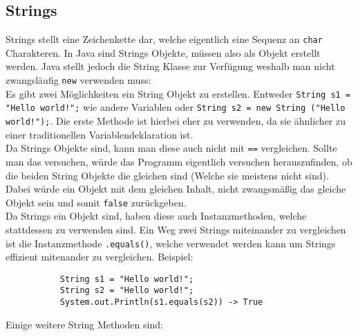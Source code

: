 \documentclass{article}
\begin{document}
	\subsection{Strings}
	Strings stellt eine Zeichenkette dar, welche eigentlich eine Sequenz an \verb|char| Charakteren. In Java sind Strings Objekte, müssen also als Objekt erstellt werden. Java stellt jedoch die String Klasse zur Verfügung weshalb man nicht zwangsläufig \verb|new| verwenden muss: \\
	Es gibt zwei Möglichkeiten ein String Objekt zu erstellen. Entweder \verb|String s1 = "Hello world!";| wie andere Variablen oder \verb|String s2 = new String ("Hello world!");|. Die erste Methode ist hierbei eher zu verwenden, da sie ähnlicher zu einer traditionellen Variablendeklaration ist. \\
	Da Strings Objekte sind, kann man diese auch nicht mit \verb|==| vergleichen. Sollte man das versuchen, würde das Programm eigentlich versuchen herauszufinden, ob die beiden String Objekte die gleichen sind (Welche sie meistens nicht sind). Dabei würde ein Objekt mit dem gleichen Inhalt, nicht zwangsmäßig das gleiche Objekt sein und somit \verb|false| zurückgeben. \\
	Da Strings ein Objekt sind, haben diese auch Instanzmethoden, welche stattdessen zu verwenden sind. Ein Weg zwei Strings miteinander zu vergleichen ist die Instanzmethode \verb|.equals()|, welche verwendet werden kann um Strings effizient mitenander zu vergleichen. Beispiel:\\
	\begin{verbatim}
	       String s1 = "Hello world!";
	       String s2 = "Hello world!";
	       System.out.Println(s1.equals(s2)) -> True
	\end{verbatim}
	Einige weitere String Methoden sind:
\end{document}
